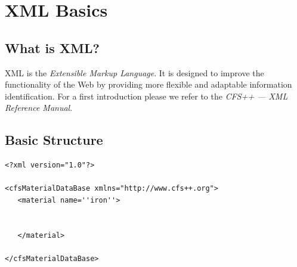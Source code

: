 \chapter{XML Basics}

\section{What is XML?}
XML is the \emph{Extensible Markup Language}. It is designed to
improve the functionality of the Web by providing more flexible and
adaptable information identification. For a first introduction please
we refer to the {\it CFS++ --- XML Reference Manual}.


\section{Basic Structure}

\begin{verbatim}
<?xml version="1.0"?>

<cfsMaterialDataBase xmlns="http://www.cfs++.org">
   <material name=''iron''>


   </material>

</cfsMaterialDataBase>
\end{verbatim}